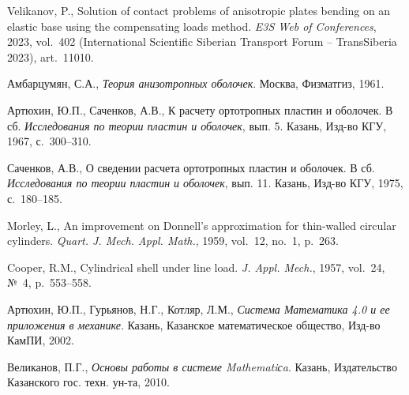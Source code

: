 \documentclass[press]{vestnik}
\begin{document}
\begin{thebibliography}{21}
Velikanov, P., Solution of contact problems of anisotropic plates bending on an elastic base using the compensating loads method. \textit{E3S Web of Conferences}, 2023, vol.~402 (International Scientific Siberian Transport Forum -- TransSiberia 2023), art.~11010. 

Амбарцумян, С.А., \textit{Теория анизотропных оболочек}. Москва, Физматгиз, 1961. 

Артюхин, Ю.П., Саченков, А.В., К расчету ортотропных пластин и оболочек. В сб. \textit{Исследования по теории пластин и оболочек}, вып. 5. Казань, Изд-во КГУ, 1967, с.~300--310. 

Саченков, А.В., О сведении расчета ортотропных пластин и оболочек. В сб. \textit{Исследования по теории пластин и оболочек}, вып. 11. Казань, Изд-во КГУ, 1975, с.~180--185. 

Morley, L., An improvement on Donnell's approximation for thin-walled circular cylinders. \textit{Quart. J. Mech. Appl. Math.}, 1959, vol.~12, no.~1, p.~263. 

Cooper, R.M., Cylindrical shell under line load. \textit{J. Appl. Mech.}, 1957, vol.~24, №~4, p.~553--558. 

Артюхин, Ю.П., Гурьянов, Н.Г., Котляр, Л.М., \textit{Система Математика 4.0 и ее приложения в механике}. Казань, Казанское математическое общество, Изд-во КамПИ, 2002. 

Великанов, П.Г., \textit{Основы работы в системе Mathematiсa}. Казань, Издательство Казанского гос. техн. ун-та, 2010. 


\end{thebibliography}
\end{document}

